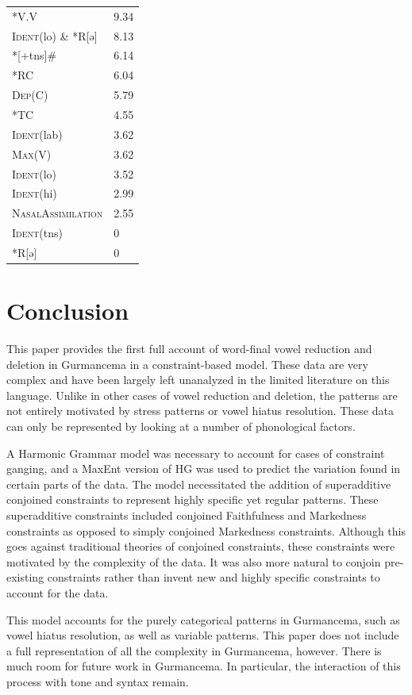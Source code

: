 \documentclass[output=paper,newtxmath,modfonts,nonflat,draftmode]{langsci/langscibook}
\begin{document}
\ea \label{ex:baird:17}
\begin{tabular}[t]{ll}
	*V.V &  9.34 \\
	\textsc{Ident}(lo) \&  *R[ə] &  8.13 \\
	*[+tns]\# &  6.14 \\
	*RC &  6.04\\
	\textsc{Dep}(C) &  5.79\\
	*TC &  4.55\\
	\textsc{Ident}(lab) &  3.62\\
	\textsc{Max}(V) &  3.62\\
	\textsc{Ident}(lo) &  3.52\\
	\textsc{Ident}(hi) &  2.99\\
	\textsc{NasalAssimilation} &  2.55\\
	\textsc{Ident}(tns) &  0\\
	*R[ə] &  0\\
\end{tabular}
\z

\section{Conclusion}\label{sec:baird:6}

This paper provides the first full account of word-final vowel reduction and deletion in Gurmancema in a constraint-based model. These data are very complex and have been largely left unanalyzed in the limited literature on this language. Unlike in other cases of vowel reduction and deletion, the patterns are not entirely motivated by stress patterns or vowel hiatus resolution. These data can only be represented by looking at a number of phonological factors.  
	
A Harmonic Grammar model was necessary to account for cases of constraint ganging, and a MaxEnt version of HG was used to predict the variation found in certain parts of the data. The model necessitated the addition of superadditive conjoined constraints to represent highly specific yet regular patterns. These superadditive constraints included conjoined Faithfulness and Markedness constraints as opposed to simply conjoined Markedness constraints. Although this goes against traditional theories of conjoined constraints, these constraints were motivated by the complexity of the data. It was also more natural to conjoin pre-existing constraints rather than invent new and highly specific constraints to account for the data.   

This model accounts for the purely categorical patterns in Gurmancema, such as vowel hiatus resolution, as well as variable patterns. This paper does not include a full representation of all the complexity in Gurmancema, however. There is much room for future work in Gurmancema. In particular, the interaction of this process with tone and syntax remain. 
\end{document}
